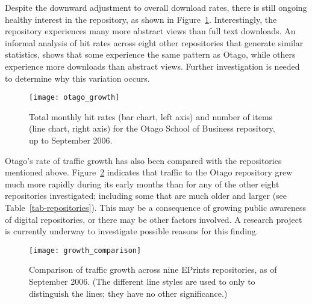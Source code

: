 \documentclass[12pt,pdftex,a4paper,titlepage]{article}
\begin{document}
Despite the downward adjustment to overall download rates, there is still ongoing healthy interest in the repository, as shown in Figure~\ref{fig-otago-growth}. Interestingly, the repository experiences many more abstract views than full text downloads. An informal analysis of hit rates across eight other repositories that generate similar statistics, shows that some experience the same pattern as Otago, while others experience more downloads than abstract views. Further investigation is needed to determine why this variation occurs.


\begin{figure}
	\centering
	\texttt{[image: otago\_growth]}
	\caption{Total monthly hit rates (bar chart, left axis) and number of items (line chart, right axis) for the Otago School of Business repository, up to September 2006.}
	\label{fig-otago-growth}
\end{figure}


Otago's rate of traffic growth has also been compared with the repositories mentioned above. Figure~\ref{fig-growth-comparison} indicates that traffic to the Otago repository grew much more rapidly during its early months than for any of the other eight repositories investigated; including some that are much older and larger (see Table~\ref{tab-repositories}). This may be a consequence of growing public awareness of digital repositories, or there may be other factors involved. A research project is currently underway to investigate possible reasons for this finding.


\begin{figure}
	\centering
	\texttt{[image: growth\_comparison]}
	\caption{Comparison of traffic growth across nine EPrints repositories, as of September 2006. (The different line styles are used to only to distinguish the lines; they have no other significance.)}
	\label{fig-growth-comparison}
\end{figure}
\end{document}
